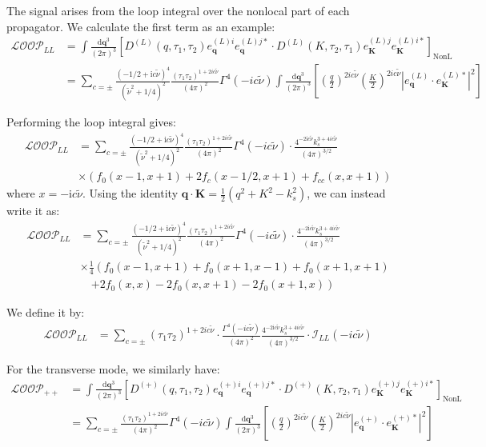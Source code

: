 \documentclass[a4paper,12pt]{article}
\def\di{{\mathrm{d}}}
\def\mb{\mathbf}
\def\ii{\mathrm{i}}
\def\tn{\tilde\nu}
\begin{document}
The signal arises from the loop integral over the nonlocal part of each propagator. We calculate the first term as an example:
\begin{align}
    \mathcal{{LOOP}}_{LL}
    &=\int \frac{\di \mb{q}^3}{(2\pi)^3} \left[ D^{(L)}(q,\tau_1,\tau_2) e^{(L)i}_{\mb q} e^{(L)j*}_{\mb q} \cdot D^{(L)}(K,\tau_2,\tau_1) e^{(L)j}_{\mb K} e^{(L)i*}_{\mb K} \right]_{\text{NonL}} \nonumber \\
    &= \sum_{c=\pm} \frac{(-1/2+\ii c\tn)^4}{(\tilde\nu^2 + 1/4)^2} \frac{(\tau_1 \tau_2)^{1+2ic\tn}}{(4\pi)^2} \Gamma^4(-ic\tn) \int \frac{\di \mb{q}^3}{(2\pi)^3}\left[  \left( \frac{q}{2} \right)^{2ic\tn} \left( \frac{K}{2} \right)^{2ic\tn} |e^{(L)}_{\mb q} \cdot e^{(L)*}_{\mb K}|^2 \right]
\end{align}

Performing the loop integral gives:
\begin{align}
    \mathcal{{LOOP}}_{LL}
    &= \sum_{c=\pm} \frac{(-1/2+\ii c\tn)^4}{(\tilde\nu^2 + 1/4)^2} \frac{(\tau_1 \tau_2)^{1+2ic\tn}}{(4\pi)^2} \Gamma^4(-ic\tn) \cdot \frac{4^{-2\ii c\tn} k_s^{3+4ic\tn}}{(4\pi)^{3/2}} \nonumber \\
    &\times \left( f_0(x-1,x+1) +2f_c(x-1/2,x+1) +f_{cc}(x,x+1) \right)
\end{align}
where $x=-\ii c\tn$. Using the identity $\mb q \cdot \mb K=\frac{1}{2}(q^2+K^2-k_s^2)$, we can instead write it as:
\begin{align}
    \mathcal{{LOOP}}_{LL}
     &= \sum_{c=\pm} \frac{(-1/2+\ii c\tn)^4}{(\tilde\nu^2 + 1/4)^2} \frac{(\tau_1 \tau_2)^{1+2ic\tn}}{(4\pi)^2} \Gamma^4(-ic\tn) \cdot \frac{4^{-2\ii c\tn} k_s^{3+4ic\tn}}{(4\pi)^{3/2}} \nonumber \\
    &\times \frac{1}{4} \left(f_0(x-1,x+1) + f_0(x+1,x-1) + f_0(x+1,x+1) \right. \nonumber \\
    &\quad \left. +2f_0(x,x) - 2f_0(x,x+1) - 2f_0(x+1,x)  \right)
\end{align}

We define it by:
\begin{align}
    \mathcal{{LOOP}}_{LL}
    &= \sum_{c=\pm}
    (\tau_1 \tau_2)^{1+2ic\tn} \cdot
    \frac{\Gamma^4(-ic\tn)}{(4\pi)^2}
    \frac{4^{-2\ii c\tn} k_s^{3+4ic\tn}}{(4\pi)^{3/2}} 
    \cdot \mathcal{I}_{LL}(-ic\tn)
\end{align}

For the transverse mode, we similarly have:
\begin{align}
    \mathcal{{LOOP}}_{++}
    &= \int \frac{\di \mb{q}^3}{(2\pi)^3} \left[ D^{(+)}(q,\tau_1,\tau_2) e^{(+)i}_{\mb q} e^{(+)j*}_{\mb q} \cdot D^{(+)}(K,\tau_2,\tau_1) e^{(+)j}_{\mb K} e^{(+)i*}_{\mb K} \right]_{\text{NonL}} \nonumber \\
    &= \sum_{c=\pm} \frac{(\tau_1 \tau_2)^{1+2ic\tn}}{(4\pi)^2} \Gamma^4(-ic\tn) \int \frac{\di \mb{q}^3}{(2\pi)^3}\left[  \left( \frac{q}{2} \right)^{2ic\tn} \left( \frac{K}{2} \right)^{2ic\tn} |e^{(+)}_{\mb q} \cdot e^{(+)*}_{\mb K}|^2 \right] 
\end{align}
\end{document}
